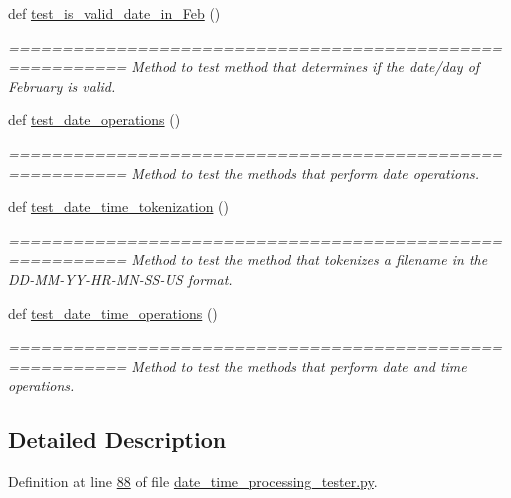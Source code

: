 \begin{DoxyCompactItemize}
def \hyperlink{classutilities_1_1date__time__processing__tester_1_1date__time__operations__tester_a69aaf4f9d5369d9730be1c41980f6708}{test\+\_\+is\+\_\+valid\+\_\+date\+\_\+in\+\_\+\+Feb} ()
\begin{DoxyCompactList}\small\item\em ========================================================= Method to test method that determines if the date/day of February is valid. \end{DoxyCompactList}\item 
def \hyperlink{classutilities_1_1date__time__processing__tester_1_1date__time__operations__tester_a02e06fd6efcdf83ecedfe2b06eb6c965}{test\+\_\+date\+\_\+operations} ()
\begin{DoxyCompactList}\small\item\em ========================================================= Method to test the methods that perform date operations. \end{DoxyCompactList}\item 
def \hyperlink{classutilities_1_1date__time__processing__tester_1_1date__time__operations__tester_ad2310ba49049da0632ac87e93dbecd4f}{test\+\_\+date\+\_\+time\+\_\+tokenization} ()
\begin{DoxyCompactList}\small\item\em ========================================================= Method to test the method that tokenizes a filename in the D\+D-\/\+M\+M-\/\+Y\+Y-\/\+H\+R-\/\+M\+N-\/\+S\+S-\/\+U\+S format. \end{DoxyCompactList}\item 
def \hyperlink{classutilities_1_1date__time__processing__tester_1_1date__time__operations__tester_a6582bc9ede3803192a54abe03c7c0f7e}{test\+\_\+date\+\_\+time\+\_\+operations} ()
\begin{DoxyCompactList}\small\item\em ========================================================= Method to test the methods that perform date and time operations. \end{DoxyCompactList}\end{DoxyCompactItemize}


\subsection{Detailed Description}


Definition at line \hyperlink{date__time__processing__tester_8py_source_l00088}{88} of file \hyperlink{date__time__processing__tester_8py_source}{date\+\_\+time\+\_\+processing\+\_\+tester.\+py}.



